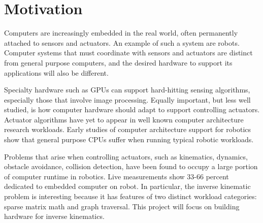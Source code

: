 \section{Motivation}

Computers are increasingly embedded in the real world, often permanently attached to sensors and actuators. An example of such a system are robots. Computer systems that must coordinate with sensors and actuators are distinct from general purpose computers, and the desired hardware to support its applications will also be different.

Specialty hardware such as GPUs can support hard-hitting sensing algorithms, especially those that involve image processing. Equally important, but less well studied, is how computer hardware should adapt to support controlling actuators. Actuator algorithms have yet to appear in well known computer architecture research workloads. Early studies of computer architecture support for robotics show that general purpose CPUs suffer when running typical robotic workloads\cite{Caselli}.

Problems that arise when controlling actuators, such as kinematics, dynamics, obstacle avoidance, collision detection, have been found to occupy a large portion of computer runtime in robotics. Live measurements show 33-66 percent dedicated to embedded computer on robot. In particular, the inverse kinematic problem is interesting because it has features of two distinct workload categories: sparse matrix math and graph traversal\cite{dwarfs}. This project will focus on building hardware for inverse kinematics.

